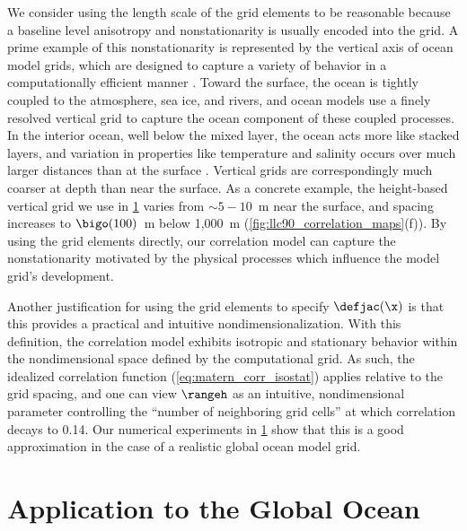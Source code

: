\documentclass[alpha-refs]{wiley-article}
\begin{document}
We consider using the length scale of the grid elements to be reasonable
because a baseline level anisotropy and nonstationarity is usually encoded
into the grid.
A prime example of this nonstationarity is represented by the vertical axis of
ocean model grids, which are designed to capture a variety of behavior in a
computationally efficient manner \citep{griffies_fundamentals_2004}.
Toward the surface, the ocean is tightly coupled to the atmosphere, sea ice, and
rivers, and ocean models use a finely resolved vertical grid to capture the
ocean component of these coupled processes.
In the interior ocean, well below the mixed layer, the ocean acts more like stacked layers, and
variation in properties like temperature and salinity occurs over much larger
distances than at the surface \citep{talley_descriptive_2011}.
Vertical grids are correspondingly much coarser at depth than near the surface.
As a concrete example, the height-based vertical grid we use in \cref{sec:llc90}
varies from $\sim 5-10$~m near the surface, and spacing increases to
$\bigo(100)$~m below 1,000~m (\cref{fig:llc90_correlation_maps}(f)).
By using the grid elements directly, our correlation model can capture the
nonstationarity motivated by the physical processes which influence the model
grid's development.

Another justification for using the grid elements to specify $\defjac(\x)$ is
that this provides a practical and intuitive nondimensionalization.
With this definition, the correlation model exhibits isotropic and stationary
behavior within the nondimensional space defined by the computational grid.
As such, the idealized correlation function (\cref{eq:matern_corr_isostat})
applies relative to the grid spacing, and one can view $\rangeh$ as an
intuitive, nondimensional parameter controlling the
``number of neighboring grid cells'' at which correlation decays to 0.14.
Our numerical experiments in \cref{sec:llc90} show that this is a good
approximation in the case of a realistic global ocean model grid.

\section{Application to the Global Ocean}
\label{sec:llc90}
\end{document}
